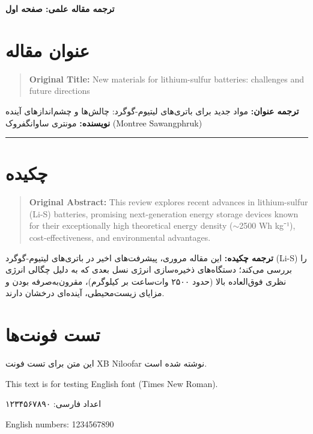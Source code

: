 \documentclass[12pt,a4paper]{article}
\newcommand{\persian}[1]{\textfarsi{#1}}
\newcommand{\eng}[1]{\textenglish{#1}}
\begin{document}
\begin{center}
    \huge\bfseries\persian{ترجمه مقاله علمی: صفحه اول}
\end{center}
\vspace{1cm}

\section*{\persian{عنوان مقاله}}

\begin{quote}
    \eng{\textbf{Original Title:} New materials for lithium-sulfur batteries: challenges and future directions}
\end{quote}

\persian{\textbf{ترجمه عنوان:} مواد جدید برای باتری‌های لیتیوم-گوگرد: چالش‌ها و چشم‌اندازهای آینده}
\vspace{5mm}
\persian{\textbf{نویسنده:} مونتری ساوانگفروک (\eng{Montree Sawangphruk})}
\hrule
\vspace{5mm}

\section*{\persian{چکیده}}

\begin{quote}
    \eng{\textbf{Original Abstract:} This review explores recent advances in lithium-sulfur (Li-S) batteries, promising next-generation energy storage devices known for their exceptionally high theoretical energy density ($\sim$2500 Wh kg⁻¹), cost-effectiveness, and environmental advantages.}
\end{quote}

\persian{
\textbf{ترجمه چکیده:} این مقاله مروری، پیشرفت‌های اخیر در باتری‌های لیتیوم-گوگرد (\eng{Li-S}) را بررسی می‌کند؛ دستگاه‌های ذخیره‌سازی انرژی نسل بعدی که به دلیل چگالی انرژی نظری فوق‌العاده بالا (حدود ۲۵۰۰ وات‌ساعت بر کیلوگرم)، مقرون‌به‌صرفه بودن و مزایای زیست‌محیطی، آینده‌ای درخشان دارند.
}

\section*{\persian{تست فونت‌ها}}

\persian{این متن برای تست فونت XB Niloofar نوشته شده است.}

\eng{This text is for testing English font (Times New Roman).}

\persian{اعداد فارسی: ۱۲۳۴۵۶۷۸۹۰}

\eng{English numbers: 1234567890}
\end{document}
